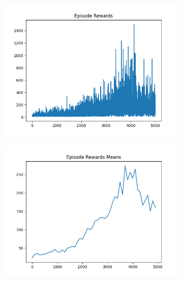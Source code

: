 \begin{figure}[H]
    \centering
    \begin{subfigure}{.47\linewidth}
        \centering
        \includegraphics[width=\textwidth]{pole/2024-06-13_22-34-12_dqn_cartpole_episode_rewards.png}
    \end{subfigure}
    \begin{subfigure}{.47\linewidth}
        \centering
        \includegraphics[width=\textwidth]{pole/2024-06-13_22-34-12_dqn_cartpole_episode_rewards_means.png}
    \end{subfigure}
    \begin{subfigure}{.47\linewidth}
        \centering

\end{subfigure}
\end{figure}
